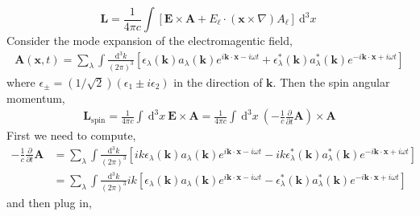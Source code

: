 \documentclass[12pt]{extarticle}
\newcommand{\dn}[2]{\: \mathrm{d}^{#1} #2 \:}
\newcommand{\pderiv}[2]{\frac{\partial{#1}}{\partial{#2}}}
\renewcommand{\bf}[1]{\mathbf{#1}}
\theoremstyle{definition}
\begin{document}
\[ \bf{L} = \frac{1}{4 \pi c} \int \left[ \bf{E} \times \bf{A} + E_{\ell} \cdot (\bf{x} \times \nabla) A_{\ell}  \right] \dn{3}{x} \]
Consider the mode expansion of the electromagentic field,
\begin{align*}
\bf{A}(\bf{x}, t) = \sum_{\lambda} \int \frac{\dn{3}{k}}{(2 \pi)^3} \left[ \epsilon_{\lambda}(\bf{k}) a_\lambda (\bf{k}) e^{i \bf{k} \cdot \bf{x} - i \omega t} + \epsilon_\lambda^*(\bf{k}) a_\lambda^*(\bf{k}) e^{- i \bf{k} \cdot \bf{x} + i \omega t} \right]
\end{align*}
where $\epsilon_{\pm} = (1/\sqrt{2})(\epsilon_1 \pm i \epsilon_2)$ in the direction of $\bf{k}$. Then the spin angular momentum,
\begin{align*}
\bf{L}_{\text{spin}} = \frac{1}{4 \pi c} \int \dn{3}{x}  \bf{E} \times \bf{A} = \frac{1}{4 \pi c} \int \dn{3}{x} \left( -\frac{1}{c} \pderiv{}{t} \bf{A} \right) \times \bf{A} 
\end{align*}  
First we need to compute,
\begin{align*}
- \frac{1}{c} \pderiv{}{t} \bf{A} & = \sum_{\lambda} \int \frac{\dn{3}{k}}{(2 \pi)^3} \left[ ik \epsilon_{\lambda}(\bf{k}) a_\lambda (\bf{k}) e^{i \bf{k} \cdot \bf{x} - i \omega t} - i k  \epsilon_\lambda^*(\bf{k}) a_\lambda^*(\bf{k}) e^{- i \bf{k} \cdot \bf{x} + i \omega t} \right]
\\
& = \sum_{\lambda} \int \frac{\dn{3}{k}}{(2 \pi)^3}  i k  \left[\epsilon_{\lambda}(\bf{k}) a_\lambda (\bf{k}) e^{i \bf{k} \cdot \bf{x} - i \omega t} - \epsilon_\lambda^*(\bf{k}) a_\lambda^*(\bf{k}) e^{- i \bf{k} \cdot \bf{x} + i \omega t} \right]
\end{align*}
and then plug in,
\end{document}
